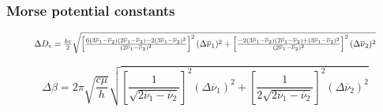 \documentclass[12pt]{article}
\begin{document}
\subsubsection{Morse potential constants}

\begin{equation}
    \resizebox{0.9\textwidth}{!}{$
    \Delta D_e = \frac{hc}{2} \sqrt{\left[ \frac{6(3\overline{\nu}_1 - \overline{\nu}_2)(2\overline{\nu}_1 - \overline{\nu}_2) -2(3\overline{\nu}_1 - \overline{\nu}_2)^2}{(2 \overline{\nu}_1 - \overline{\nu}_2)^2} \right]^2 (\Delta \overline{\nu}_1)^2 + \left[ \frac{-2(3\overline{\nu}_1 - \overline{\nu}_2)(2\overline{\nu}_1 - \overline{\nu}_2) + (3\overline{\nu}_1 - \overline{\nu}_2)^2}{(2 \overline{\nu}_1 - \overline{\nu}_2)^2} \right]^2(\Delta \overline{\nu}_2)^2}$}
\end{equation}

\begin{equation}
    \Delta \beta = 2 \pi \sqrt{\frac{c\mu}{h}}\sqrt{\left[ \frac{1}{\sqrt{2\overline{\nu}_1-\overline{\nu}_2}} \right]^2(\Delta \overline{\nu}_1)^2 + \left[ \frac{1}{2\sqrt{2\overline{\nu}_1-\overline{\nu}_2}} \right]^2(\Delta \overline{\nu}_2)^2 }
\end{equation}

\nocite{LabGuideInfraRedSpectroscopy}

\printbibliography
\end{document}
